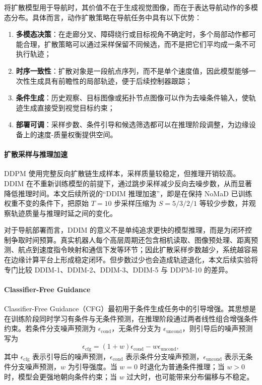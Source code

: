 将扩散模型用于导航时，其价值不在于生成视觉图像，而在于表达导航动作的多模态分布。具体而言，动作扩散策略在导航任务中具有以下优势：
\begin{enumerate}
    \item \textbf{多模态决策}：在走廊分叉、障碍绕行或目标视角不确定时，多个局部动作都可能合理，扩散策略可以通过采样保留不同候选，而不是把它们平均成一条不可执行轨迹；
    \item \textbf{时序一致性}：扩散对象是一段航点序列，而不是单个速度值，因此模型能够一次性生成具有前瞻性的局部轨迹，便于后续控制器跟踪；
    \item \textbf{条件生成}：历史观察、目标图像或拓扑节点图像可以作为去噪条件输入，使轨迹生成直接受到视觉目标约束；
    \item \textbf{部署可调}：采样步数、条件引导和候选筛选都可以在推理阶段调整，为边缘设备上的速度-质量权衡提供空间。
\end{enumerate}

\paragraph*{扩散采样与推理加速}

DDPM 使用完整反向扩散链生成样本，采样质量较稳定，但推理开销较高\cite{ddpm2020}。DDIM 在不重新训练模型的前提下，通过跳步采样减少反向去噪步数，从而显著降低推理时间\cite{ddim2020}。本文后续所说的``DDIM 推理加速''，即是在保持 NoMaD 已训练权重不变的条件下，把原始 $T=10$ 步采样压缩为 $S=5/3/2/1$ 等较少步数，并观察轨迹质量与推理时延之间的变化。

对于导航部署而言，DDIM 的意义不是单纯追求更快的模型推理，而是为闭环控制争取时间预算。真实机器人每个高层周期还包含相机读取、图像预处理、距离预测、航点到速度指令映射和通信下发等环节；因此扩散采样步数越少，系统越容易在边缘计算平台上形成稳定闭环。但步数过少也会造成轨迹退化，本文后续实验将专门比较 DDIM-1、DDIM-2、DDIM-3、DDIM-5 与 DDPM-10 的差异。

\paragraph*{Classifier-Free Guidance}

Classifier-Free Guidance（CFG）最初用于条件生成任务中的引导增强\cite{cfg2022}。其思想是在训练阶段同时学习有条件与无条件预测，在推理阶段通过两者线性组合增强条件约束。若条件分支噪声预测为 $\epsilon_{\text{cond}}$，无条件分支为 $\epsilon_{\text{uncond}}$，则引导后的噪声预测写为
\begin{equation}
\epsilon_{\text{cfg}} = (1+w)\epsilon_{\text{cond}} - w\epsilon_{\text{uncond}},
\end{equation}
其中 $\epsilon_{\text{cfg}}$ 表示引导后的噪声预测，$\epsilon_{\text{cond}}$ 表示条件分支噪声预测，$\epsilon_{\text{uncond}}$ 表示无条件分支噪声预测，$w$ 为引导强度。当 $w=0$ 时退化为普通条件推理；当 $w>0$ 时，模型会更强地朝向条件约束；当 $w$ 过大时，也可能带来分布偏移与不稳定。

